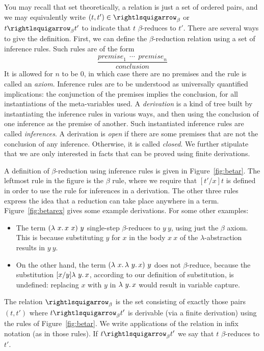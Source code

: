 You may recall that set theoretically, a relation is just a set of
ordered pairs, and we may equivalently write $(t,t')\in\betar$ or $t
\betar t'$ to indicate that $t$ $\beta$-reduces to $t'$.  There are
several ways to give the definition.
First, we can define the $\beta$-reduction relation using a set of inference rules.
Such rules are of the form
\[
\frac{\textit{premise}_1 \ \ \cdots \ \ \textit{premise}_n}{\textit{conclusion}}
\]
\noindent It is allowed for $n$ to be $0$, in which case there are no
premises and the rule is called an \emph{axiom}.  Inference rules are
to be understood as universally quantified implications: the
conjunction of the premises implies the conclusion, for all
instantiations of the meta-variables used.  A \emph{derivation} is a
kind of tree built by instantiating the inference rules in various
ways, and then using the conclusion of one inference as the premise of
another.  Such instantiated inference rules are
called \emph{inferences}.  A derivation is
\emph{open} if there are some premises that are not the conclusion of
any inference.  Otherwise, it is called
\emph{closed}. We further stipulate that we
are only interested in facts that can be proved using finite
derivations.  

A definition of $\beta$-reduction using inference rules is given in
Figure~\ref{fig:betar}.  The leftmost rule in the figure is the
$\beta$ rule, where we require that $[t'/x]t$ is defined
in order to use the rule for inferences in a derivation.  The other
three rules express the idea that a reduction can take place anywhere
in a term.  Figure~\ref{fig:betarex} gives some example derivations.
For some other examples:
\begin{itemize}
\item The term $(\lambda\ x.\, x\ x)\ y$ single-step $\beta$-reduces to $y\ y$,
  using just the $\beta$ axiom.  This is because substituting $y$ for $x$
  in the body $x\ x$ of the $\lambda$-abstraction results in $y\ y$.
\item On the other hand, the term $(\lambda\ x.\, \lambda\ y.\, x)\ y$ does not
  $\beta$-reduce, because the substitution $[x/y]\lambda\ y.\, x$, according
  to our definition of substitution, is undefined: replacing $x$ with $y$ in
  $\lambda\ y.\, x$ would result in variable capture.
  \end{itemize}
  
\begin{definition}
\label{def:beta}
The relation $\betar$ is the set consisting of exactly those
pairs $(t,t')$ where $t \betar t'$ is derivable (via a finite derivation) using the
rules of Figure~\ref{fig:betar}.  We write applications of the
relation in infix notation (as in those rules).  If $t \betar t'$
we say that $t$ $\beta$-reduces to $t'$.  
\end{definition}

